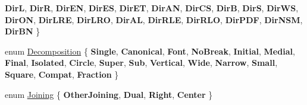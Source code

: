 \begin{DoxyCompactItemize}
{\bfseries DirL}, 
{\bfseries DirR}, 
{\bfseries Dir\+EN}, 
{\bfseries Dir\+ES}, 
\newline
{\bfseries Dir\+ET}, 
{\bfseries Dir\+AN}, 
{\bfseries Dir\+CS}, 
{\bfseries DirB}, 
\newline
{\bfseries DirS}, 
{\bfseries Dir\+WS}, 
{\bfseries Dir\+ON}, 
{\bfseries Dir\+L\+RE}, 
\newline
{\bfseries Dir\+L\+RO}, 
{\bfseries Dir\+AL}, 
{\bfseries Dir\+R\+LE}, 
{\bfseries Dir\+R\+LO}, 
\newline
{\bfseries Dir\+P\+DF}, 
{\bfseries Dir\+N\+SM}, 
{\bfseries Dir\+BN}
 \}
\item 
enum \mbox{\hyperlink{class_q_char_a13be45046e82a6d2991cef0b7c18d522}{Decomposition}} \{ \newline
{\bfseries Single}, 
{\bfseries Canonical}, 
{\bfseries Font}, 
{\bfseries No\+Break}, 
\newline
{\bfseries Initial}, 
{\bfseries Medial}, 
{\bfseries Final}, 
{\bfseries Isolated}, 
\newline
{\bfseries Circle}, 
{\bfseries Super}, 
{\bfseries Sub}, 
{\bfseries Vertical}, 
\newline
{\bfseries Wide}, 
{\bfseries Narrow}, 
{\bfseries Small}, 
{\bfseries Square}, 
\newline
{\bfseries Compat}, 
{\bfseries Fraction}
 \}
\item 
enum \mbox{\hyperlink{class_q_char_a086edd55a90ad2cf910ca3ab5fbe7bde}{Joining}} \{ {\bfseries Other\+Joining}, 
{\bfseries Dual}, 
{\bfseries Right}, 
{\bfseries Center}
 \}
\end{DoxyCompactItemize}
